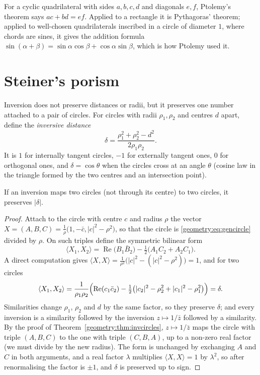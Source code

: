 For a cyclic quadrilateral with sides $a,b,c,d$ and diagonals $e,f$, Ptolemy's theorem says $ac+bd=ef$. Applied to a rectangle it is
Pythagoras' theorem; applied to well-chosen quadrilaterals inscribed in a circle of diameter $1$, where chords are sines, it gives the
addition formula $\sin(\alpha+\beta)=\sin\alpha\cos\beta+\cos\alpha\sin\beta$, which is how Ptolemy used it.

\section{Steiner's porism}

Inversion does not preserve distances or radii, but it preserves one number attached to a pair of circles. For circles with radii
$\rho_1,\rho_2$ and centres $d$ apart, define the \emph{inversive distance}
\[
\delta=\frac{\rho_1^2+\rho_2^2-d^2}{2\rho_1\rho_2}.
\]
It is $1$ for internally tangent circles, $-1$ for externally tangent ones, $0$ for orthogonal ones, and $\delta=\cos\theta$ when the circles
cross at an angle $\theta$ (cosine law in the triangle formed by the two centres and an intersection point).

\begin{proposition}\label{geometry:prop:invdistance}
If an inversion maps two circles (not through its centre) to two circles, it preserves $|\delta|$.
\end{proposition}
\begin{proof}
Attach to the circle with centre $c$ and radius $\rho$ the vector $X=(A,B,C)=\frac1\rho\bigl(1,-\bar c,|c|^2-\rho^2\bigr)$, so that the circle
is \eqref{geometry:eq:gencircle} divided by $\rho$. On such triples define the symmetric bilinear form
\[
\langle X_1,X_2\rangle=\operatorname{Re}\bigl(B_1\bar B_2\bigr)-\tfrac12\bigl(A_1C_2+A_2C_1\bigr).
\]
A direct computation gives $\langle X,X\rangle=\frac1{\rho^2}\bigl(|c|^2-(|c|^2-\rho^2)\bigr)=1$, and for two circles
\[
\langle X_1,X_2\rangle=\frac1{\rho_1\rho_2}\Bigl(\operatorname{Re}(c_1\bar c_2)-\tfrac12\bigl(|c_2|^2-\rho_2^2+|c_1|^2-\rho_1^2\bigr)\Bigr)=\delta.
\]
Similarities change $\rho_1$, $\rho_2$ and $d$ by the same factor, so they preserve $\delta$; and every inversion is a similarity followed by the
inversion $z\mapsto1/\bar z$ followed by a similarity. By the proof of Theorem~\ref{geometry:thm:invcircles}, $z\mapsto1/\bar z$ maps the circle with
triple $(A,B,C)$ to the one with triple $(C,B,A)$, up to a non-zero real factor (we must divide by the new radius). The form is unchanged by
exchanging $A$ and $C$ in both arguments, and a real factor $\lambda$ multiplies $\langle X,X\rangle=1$ by $\lambda^2$, so after renormalising
the factor is $\pm1$, and $\delta$ is preserved up to sign.
\end{proof}


